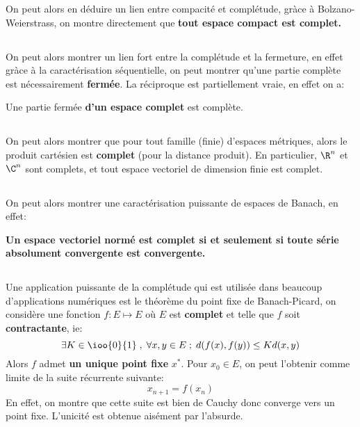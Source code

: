 On peut alors en déduire un lien entre compacité et complétude, gràce à Bolzano-Weierstrass, on montre directement que \textbf{tout espace compact est complet.}
\subsection*{}
On peut alors montrer un lien fort entre la complétude et la fermeture, en effet gràce à la caractérisation séquentielle, on peut montrer qu'une partie complète est nécessairement \textbf{fermée}. La réciproque est partiellement vraie, en effet on a:
\begin{center}
   Une partie fermée \textbf{d'un espace complet} est complète.
\end{center}
\subsection*{}
On peut alors montrer que pour tout famille (finie) d'espaces métriques, alors le produit cartésien est \textbf{complet} (pour la distance produit). En particulier, \( \R^n \) et \( \C^n \) sont complets, et tout espace vectoriel de dimension finie est complet.
\subsection*{}
On peut alors montrer une caractérisation puissante de espaces de Banach, en effet:
\begin{center}
   \textbf{Un espace vectoriel normé est complet si et seulement si toute série absolument convergente est convergente.}
\end{center}
\subsection*{}
Une application puissante de la complétude qui est utilisée dans beaucoup d'applications numériques est le théorème du point fixe de Banach-Picard, on considère une fonction \( f : E \longmapsto E \) où \( E \) est \textbf{complet} et telle que \( f \) soit \textbf{contractante}, ie:
\[ 
   \exists K \in \ioo{0}{1} \; , \; \forall x, y \in E \; ; \; d(f(x), f(y)) \leq K d(x, y) 
\]
Alors \( f \) admet \textbf{un unique point fixe} \( x^* \). Pour \( x_0 \in E \), on peut l'obtenir comme limite de la suite récurrente suivante:
\[ 
   x_{n+1} = f(x_n)
\]
En effet, on montre que cette suite est bien de Cauchy donc converge vers un point fixe. L'unicité est obtenue aisément par l'absurde.